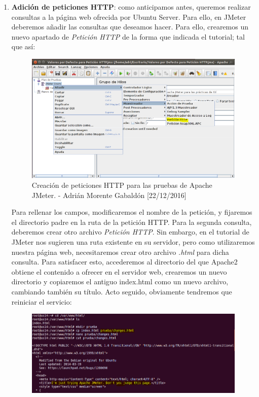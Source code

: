 \begin{enumerate}
		\item \textbf{Adición de peticiones HTTP}: como anticipamos antes, queremos realizar consultas a la página web ofrecida por Ubuntu Server. Para ello, en JMeter deberemos añadir las consultas que deseamos hacer. Para ello, crearemos un nuevo apartado de \emph{Petición HTTP} de la forma que indicada el tutorial; tal que así:
		\begin{figure}[H]
			\centering
			\includegraphics[scale=0.4]{jmeter-requests}
			\caption{Creación de peticiones HTTP para las pruebas de Apache JMeter. - Adrián Morente Gabaldón [22/12/2016]}
			\label{figura10}
		\end{figure}
		Para rellenar los campos, modificaremos el nombre de la petición, y fijaremos el directorio padre en la ruta de la petición HTTP. Para la segunda consulta, deberemos crear otro archivo \emph{Petición HTTP}. Sin embargo, en el tutorial de JMeter nos sugieren una ruta existente en su servidor, pero como utilizaremos nuestra página web, necesitaremos crear otro archivo \emph{.html} para dicha consulta. Para satisfacer esto, accederemos al directorio del que Apache2 obtiene el contenido a ofrecer en el servidor web, crearemos un nuevo directorio y copiaremos el antiguo index.html como un nuevo archivo, cambiando también su título. Acto seguido, obviamente tendremos que reiniciar el servicio:
		\begin{figure}[H]
			\centering
			\includegraphics[scale=0.4]{jmeter-changes}

\end{figure}
\end{enumerate}
